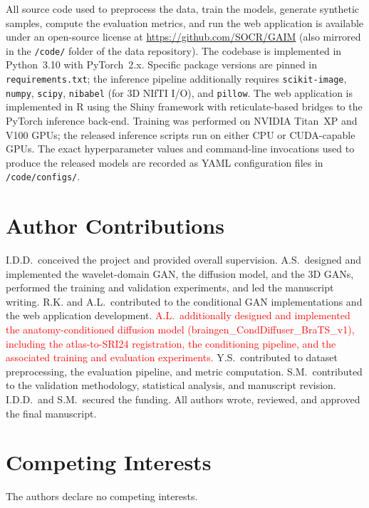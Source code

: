 \documentclass[11pt]{article}
\begin{document}
All source code used to preprocess the data, train the models, generate synthetic samples, compute the evaluation metrics, and run the web application is available under an open-source license at \url{https://github.com/SOCR/GAIM} (also mirrored in the \texttt{/code/} folder of the data repository). The codebase is implemented in Python~3.10 with PyTorch~2.x. Specific package versions are pinned in \texttt{requirements.txt}; the inference pipeline additionally requires \texttt{scikit-image}, \texttt{numpy}, \texttt{scipy}, \texttt{nibabel} (for 3D NIfTI I/O), and \texttt{pillow}. The web application is implemented in R using the Shiny framework with reticulate-based bridges to the PyTorch inference back-end. Training was performed on NVIDIA Titan~XP and V100 GPUs; the released inference scripts run on either CPU or CUDA-capable GPUs. The exact hyperparameter values and command-line invocations used to produce the released models are recorded as YAML configuration files in \texttt{/code/configs/}.

\section*{Author Contributions}

I.D.D.\ conceived the project and provided overall supervision. A.S.\ designed and implemented the wavelet-domain GAN, the diffusion model, and the 3D GANs, performed the training and validation experiments, and led the manuscript writing. R.K. and A.L.\ contributed to the conditional GAN implementations and the web application development. \textcolor{red}{A.L.\ additionally designed and implemented the anatomy-conditioned diffusion model (braingen\_CondDiffuser\_BraTS\_v1), including the atlas-to-SRI24 registration, the conditioning pipeline, and the associated training and evaluation experiments.} Y.S.\ contributed to dataset preprocessing, the evaluation pipeline, and metric computation. S.M.\ contributed to the validation methodology, statistical analysis, and manuscript revision. I.D.D.\ and S.M.\ secured the funding. All authors wrote, reviewed, and approved the final manuscript.

\section*{Competing Interests}

The authors declare no competing interests.
\end{document}
